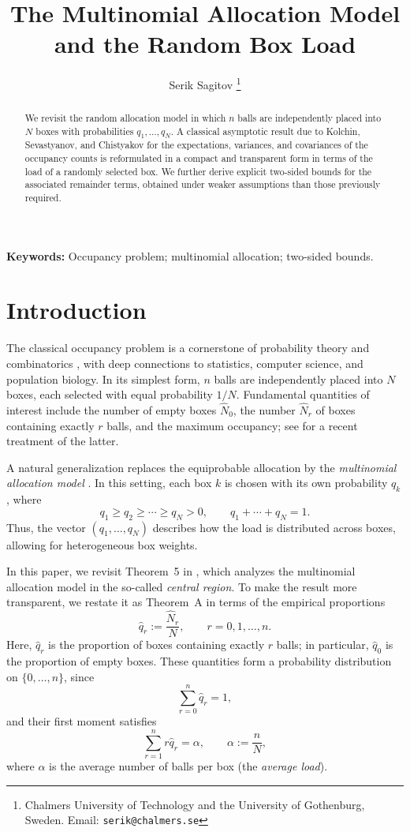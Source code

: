 \documentclass[12]{article}
\begin{document}
\title{The Multinomial Allocation Model and the Random Box Load}

\author{
Serik Sagitov%
\thanks{Chalmers University of Technology and the University of Gothenburg, Sweden. Email: \texttt{serik@chalmers.se}}
}

\maketitle

\begin{abstract}
We revisit the random allocation model in which $n$ balls are independently placed into $N$ boxes with probabilities $q_1,\ldots,q_N$. A classical asymptotic result due to Kolchin, Sevastyanov, and Chistyakov for the expectations, variances, and covariances of the occupancy counts is reformulated in a compact and transparent  form in terms of the load of a randomly selected box. We further derive explicit two-sided bounds for the associated remainder terms, obtained under weaker assumptions than those previously required.
\end{abstract}

\textbf{Keywords:} Occupancy problem; multinomial allocation; two-sided bounds.

\section{Introduction}

The classical occupancy problem is a cornerstone of probability theory and combinatorics \cite{F1}, with deep connections to statistics, computer science, and population biology. In its simplest form, $n$ balls are independently placed into $N$ boxes, each selected with equal probability $1/N$. Fundamental quantities of interest include the number of empty boxes $\hat N_0$, the number $\hat N_r$ of boxes containing exactly $r$ balls, and the maximum occupancy; see \cite{GJM} for a recent treatment of the latter.

A natural generalization replaces the equiprobable allocation by  the \textit{multinomial allocation model} \cite{KSC, BHJ}. In this setting, each box $k$ is chosen with its own probability $q_k$, where
\[
q_1 \ge q_2 \ge \cdots \ge q_N > 0, \qquad q_1 + \cdots + q_N = 1.
\]
Thus, the vector $(q_1,\ldots,q_N)$ describes how the load is distributed across boxes, allowing for heterogeneous box weights.

In this paper, we revisit Theorem~5 in \cite[Ch.~III.1]{KSC}, which analyzes the multinomial allocation model in the so-called \textit{central region}. To make the result more transparent, we restate it as Theorem~A in terms of the empirical proportions
\[
\hat q_r := \frac{\hat N_r}{N}, \qquad r = 0,1,\ldots,n.
\]
Here, $\hat q_r$ is the proportion of boxes containing exactly $r$ balls; in particular, $\hat q_0$ is the proportion of empty boxes. These quantities form a probability distribution on $\{0,\ldots,n\}$, since
\[
\sum_{r=0}^{n} \hat q_r = 1,
\]
and their first moment satisfies
\[
\sum_{r=1}^{n} r \hat q_r = \alpha, \qquad \alpha := \frac{n}{N},
\]
where $\alpha$ is the average number of balls per box (the \textit{average load}).
\end{document}
